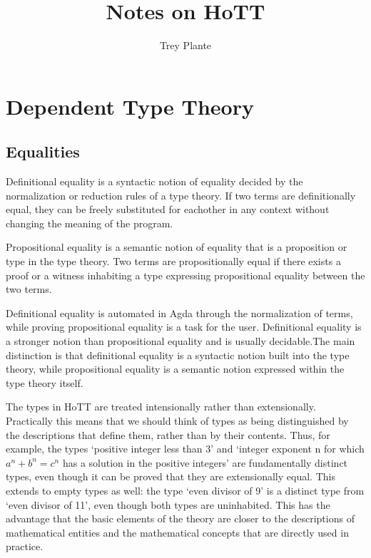 \documentclass{article}
\title{Notes on HoTT}
\author{Trey Plante}
\begin{document}
\maketitle
\section{Dependent Type Theory}
\subsection{Equalities}

\begin{definition}
  Definitional equality is a syntactic notion of equality decided by the normalization or reduction rules of a type theory. If two terms are definitionally equal, they can be freely substituted for eachother in any context without changing the meaning of the program.
\end{definition}

\begin{definition}
  Propositional equality is a semantic notion of equality that is a proposition or type in the type theory. Two terms are propositionally equal if there exists a proof or a witness inhabiting a type expressing propositional equality between the two terms.
\end{definition}

\begin{remark}
  Definitional equality is automated in Agda through the normalization of terms, while proving propositional equality is a task for the user. Definitional equality is a stronger notion than propositional equality and is usually decidable.The main distinction is that definitional equality is a syntactic notion built into the type theory, while propositional equality is a semantic notion expressed within the type theory itself.
\end{remark}

\begin{remark}
  The types in HoTT are treated intensionally rather than extensionally. Practically this means that we should think of types as being distinguished by the descriptions that define them, rather than by their contents. Thus, for example, the types ‘positive integer less than 3’ and ‘integer exponent n for which $a^n + b^n = c^n$ has a solution in the positive integers’ are fundamentally distinct types, even though it can be proved that they are extensionally equal. This extends to empty types as well: the type ‘even divisor of 9’ is a distinct type from ‘even divisor of 11’, even though both types are uninhabited. This has the advantage that the basic elements of the theory are closer to the descriptions of mathematical entities and the mathematical concepts that are directly used in practice.
\end{remark}
\end{document}
